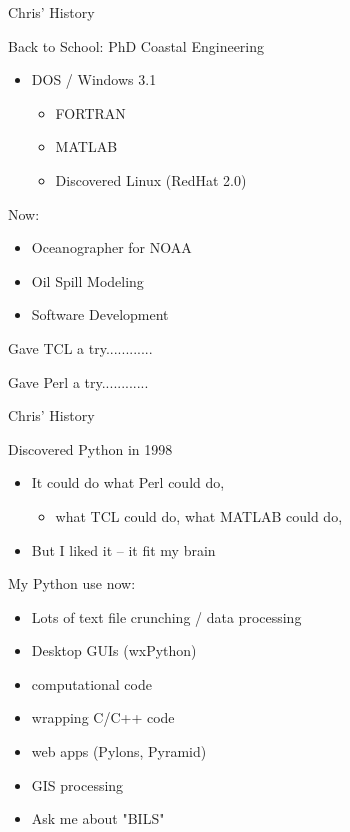\documentclass{beamer}
\begin{document}
      

\begin{frame}{Chris' History}

    {\Large Back to School: PhD Coastal Engineering }
    \begin{itemize}
      \item     DOS / Windows 3.1
      \begin{itemize}
        \item  FORTRAN
        \item  MATLAB
        \item   Discovered Linux (RedHat 2.0)
      \end{itemize}
    \end{itemize}

   \vspace{0.25in}
     
    \pause 
    {\Large Now: }
    \begin{itemize}
       \item Oceanographer for NOAA
       \item Oil Spill Modeling
       \item Software Development
    \end{itemize}

    \pause 
    \vspace{0.25in}
    {\Large Gave TCL a try............ }
    
    \pause 
    \vspace{0.15in}
    {\Large Gave Perl a try............}

\end{frame}

\begin{frame}{Chris' History}
    
{\Large Discovered Python in 1998}
\begin{itemize}
    \item It could do what Perl could do,
    \begin{itemize}
        \item what TCL could do, what MATLAB could do,
    \end{itemize}
    \item But I liked it -- it fit my brain
\end{itemize}

\vspace{0.1in}

{\Large     My Python use now:}
\begin{itemize}
   \item Lots of text file crunching / data processing
   \item Desktop GUIs (wxPython)
   \item computational code
   \item wrapping C/C++ code      
   \item web apps (Pylons, Pyramid)
   \item GIS processing
   \item Ask me about "BILS" 
\end{itemize}
\end{frame}
\end{document}
